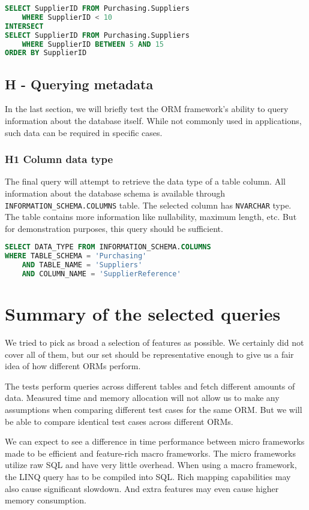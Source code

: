\begin{lstlisting}[language=SQL]
SELECT SupplierID FROM Purchasing.Suppliers 
    WHERE SupplierID < 10
INTERSECT
SELECT SupplierID FROM Purchasing.Suppliers 
    WHERE SupplierID BETWEEN 5 AND 15
ORDER BY SupplierID
\end{lstlisting}

\subsection{H - Querying metadata}
In the last section, we will briefly test the ORM framework's ability to query information about the database itself. While not commonly used in applications, such data can be required in specific cases.
\subsubsection*{H1 Column data type}
The final query will attempt to retrieve the data type of a table column. All information about the database schema is available through \texttt{INFORMATION\_SCHEMA.COLUMNS} table. The selected column has \texttt{NVARCHAR} type. The table contains more information like nullability, maximum length, etc. But for demonstration purposes, this query should be sufficient.

\begin{lstlisting}[language=SQL]
SELECT DATA_TYPE FROM INFORMATION_SCHEMA.COLUMNS 
WHERE TABLE_SCHEMA = 'Purchasing'
    AND TABLE_NAME = 'Suppliers'
    AND COLUMN_NAME = 'SupplierReference'
\end{lstlisting}

\section{Summary of the selected queries}
We tried to pick as broad a selection of features as possible. 
We certainly did not cover all of them, but our set should be representative enough to give us a fair idea of how different ORMs perform. 

The tests perform queries across different tables and fetch different amounts of data. 
Measured time and memory allocation will not allow us to make any assumptions when comparing different test cases for the same ORM.
But we will be able to compare identical test cases across different ORMs.

We can expect to see a difference in time performance between micro frameworks made to be efficient and feature-rich macro frameworks.
The micro frameworks utilize raw SQL and have very little overhead. When using a macro framework, the LINQ query has to be compiled into SQL. Rich mapping capabilities may also cause significant slowdown. And extra features may even cause higher memory consumption.

